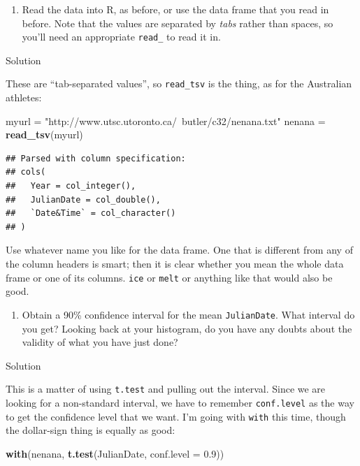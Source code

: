 \documentclass[]{tufte-book}
\newenvironment{Shaded}{}{}
\newcommand{\DataTypeTok}[1]{\textcolor[rgb]{0.56,0.13,0.00}{#1}}
\newcommand{\FloatTok}[1]{\textcolor[rgb]{0.25,0.63,0.44}{#1}}
\newcommand{\KeywordTok}[1]{\textcolor[rgb]{0.00,0.44,0.13}{\textbf{#1}}}
\newcommand{\NormalTok}[1]{#1}
\newcommand{\StringTok}[1]{\textcolor[rgb]{0.25,0.44,0.63}{#1}}
\providecommand{\tightlist}{%
  \setlength{\itemsep}{0pt}\setlength{\parskip}{0pt}}
\theoremstyle{definition}
\theoremstyle{definition}
\theoremstyle{definition}
\theoremstyle{remark}
\begin{document}
\begin{enumerate}
\def\labelenumi{(\alph{enumi})}
\tightlist
\item
  Read the data into R, as before, or use the data frame that you read
  in before. Note that the values are separated by \emph{tabs} rather
  than spaces, so you'll need an appropriate \texttt{read\_} to read it
  in.
\end{enumerate}

Solution

These are ``tab-separated values'', so \texttt{read\_tsv} is the thing,
as for the Australian athletes:

\begin{Shaded}
\begin{Highlighting}[]
\NormalTok{myurl =}\StringTok{ "http://www.utsc.utoronto.ca/~butler/c32/nenana.txt"}
\NormalTok{nenana =}\StringTok{ }\KeywordTok{read_tsv}\NormalTok{(myurl)}
\end{Highlighting}
\end{Shaded}

\begin{verbatim}
## Parsed with column specification:
## cols(
##   Year = col_integer(),
##   JulianDate = col_double(),
##   `Date&Time` = col_character()
## )
\end{verbatim}

Use whatever name you like for the data frame. One that is different
from any of the column headers is smart; then it is clear whether you
mean the whole data frame or one of its columns. \texttt{ice} or
\texttt{melt} or anything like that would also be good.

\begin{enumerate}
\def\labelenumi{(\alph{enumi})}
\setcounter{enumi}{1}
\tightlist
\item
  Obtain a 90\% confidence interval for the mean \texttt{JulianDate}.
  What interval do you get? Looking back at your histogram, do you have
  any doubts about the validity of what you have just done?
\end{enumerate}

Solution

This is a matter of using \texttt{t.test} and pulling out the interval.
Since we are looking for a non-standard interval, we have to remember
\texttt{conf.level} as the way to get the confidence level that we want.
I'm going with \texttt{with} this time, though the dollar-sign thing is
equally as good:

\begin{Shaded}
\begin{Highlighting}[]
\KeywordTok{with}\NormalTok{(nenana, }\KeywordTok{t.test}\NormalTok{(JulianDate, }\DataTypeTok{conf.level =} \FloatTok{0.9}\NormalTok{))}
\end{Highlighting}
\end{Shaded}
\end{document}
